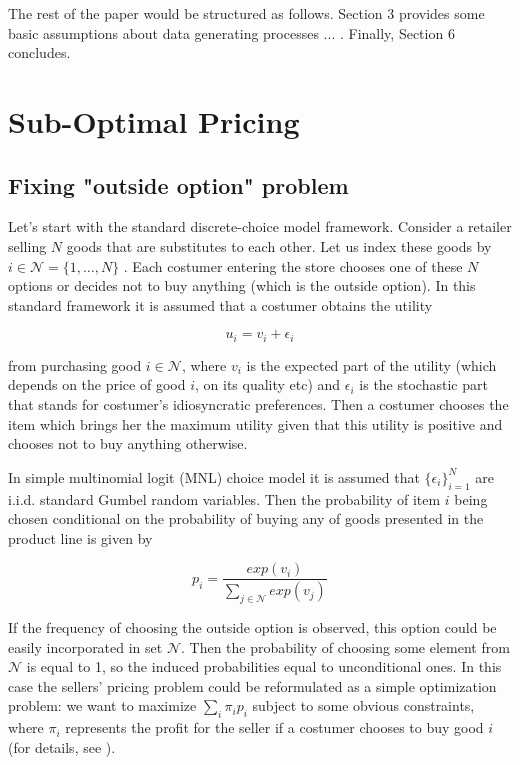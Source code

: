\documentclass[12pt]{article}
\begin{document}
\par The rest of the paper would be structured as follows. Section 3 provides some basic assumptions about data generating processes ... . Finally, Section 6 concludes.


\section{Sub-Optimal Pricing}
\label{sect5}
\subsection{Fixing "outside option" problem}

Let's start with the standard discrete-choice model framework.
Consider a retailer selling $N$ goods that are substitutes to each other.
Let us index these goods by $i \in \mathcal{N} = \{1, \dots , N\}$ .
Each costumer entering the store chooses one of these $N$ options or decides not to buy anything (which is the outside option).
In this standard framework it is assumed that a costumer obtains the utility 

\begin{equation*}
u_i = v_i + \epsilon_i
\end{equation*} 

from purchasing good $i \in \mathcal{N} $, where $v_i$ is the expected part of the utility (which depends on the price of good $i$, on its quality etc) and $\epsilon_i$ is the stochastic part that stands for costumer's idiosyncratic preferences.
Then a costumer chooses the item which brings her the maximum utility given that this utility is positive and chooses not to buy anything otherwise.

\par In simple multinomial logit (MNL) choice model it is assumed that $\{ \epsilon_i \}_{i=1}^{N}$ are i.i.d. standard Gumbel random variables.
Then the probability of item $i$ being chosen conditional on the probability of buying any of goods presented in the product line is given by

\begin{equation}
\label{eq:probs}
p_i = \frac{exp(v_i)}{\sum_{j \in \mathcal{N}} exp(v_j)}
\end{equation} 

\par If the frequency of choosing the outside option is observed, this option could be easily incorporated in set $\mathcal{N}$.
Then the probability of choosing some element from $\mathcal{N}$ is equal to 1, so the induced probabilities equal to unconditional ones.
In this case the sellers' pricing problem could be reformulated as a simple optimization problem: we want to maximize $\sum_i \pi_i p_i$ subject to some obvious constraints, where $\pi_i$ represents the profit for the seller if a costumer chooses to buy good $i$ (for details, see \cite{du2016optimal}).
\end{document}
